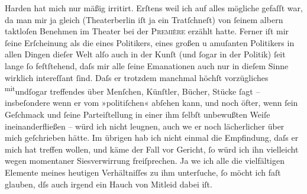 \pstart
           {\pb}Harden hat mich nur mäßig irritirt. Erſtens
               weil ich auf alles mögliche gefaſſt war, da man mir ja gleich (Theaterberlin iſt ja ein Tratſchneſt) von{ }ſeinem albern
               taktloſen Benehmen im Theater bei der \textsc{Première} erzählt hatte. Ferner iſt mir{ }ſeine Erſcheinung als die eines Politikers, eines
               großen u amuſanten Politikers in allen Dingen dieſer Welt alſo auch in der Kunſt (und{ }ſogar in der Politik){ }ſeit lange{ }ſo feſtſtehend, {\pb}daſs
               mir alle{ }ſeine Emanationen auch nur in dieſem Sinne wirklich intereſſant{ }ſind. Daſs
               er trotzdem manchmal höchſt vorzügliches \substVorne{}\textsuperscript{mit}\substDazwischen{}und\substHinten{}{ }ſogar treffendes über Menſchen, Künſtler,
               Bücher, Stücke{ }ſagt – insbeſondere wenn er vom »politiſchen« abſehen kann, und noch
               öfter, wenn{ }ſein Geſchmack und{ }ſeine Parteiſtellung in einer ihm{ }ſelbſt unbewußten
               Weiſe ineinanderfließen – würd ich nicht leugnen, auch we{\geminationn} er noch lächerlicher über mich geſchrie{\pb}ben hätte. Im übrigen hab ich nicht
               einmal die Empfindung, daſs er mich hat treffen wollen, und käme der Fall vor
               Gericht,{ }ſo würd ich ihn vielleicht wegen momentaner Si{\geminationn}esverwirrung freiſprechen. Ja we{\geminationn} ich alle die
               vielfältigen Elemente meines heutigen Verhältniſſes zu ihm unterſuche,{ }ſo möcht ich
               faſt glauben, dſs auch irgend ein Hauch von Mitleid dabei iſt.\pend
           
